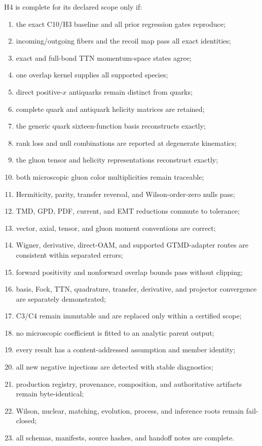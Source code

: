 \documentclass[11pt]{article}
\begin{document}
H4 is complete for its declared scope only if:
\begin{enumerate}
\item the exact C10/H3 baseline and all prior regression gates reproduce;
\item incoming/outgoing fibers and the recoil map pass all exact identities;
\item exact and full-bond TTN momentum-space states agree;
\item one overlap kernel supplies all supported species;
\item direct positive-\(x\) antiquarks remain distinct from quarks;
\item complete quark and antiquark helicity matrices are retained;
\item the generic quark sixteen-function basis reconstructs exactly;
\item rank loss and null combinations are reported at degenerate kinematics;
\item the gluon tensor and helicity representations reconstruct exactly;
\item both microscopic gluon color multiplicities remain traceable;
\item Hermiticity, parity, transfer reversal, and Wilson-order-zero nulls pass;
\item TMD, GPD, PDF, current, and EMT reductions commute to tolerance;
\item vector, axial, tensor, and gluon moment conventions are correct;
\item Wigner, derivative, direct-OAM, and supported GTMD-adapter routes are
consistent within separated errors;
\item forward positivity and nonforward overlap bounds pass without clipping;
\item basis, Fock, TTN, quadrature, transfer, derivative, and projector
convergence are separately demonstrated;
\item C3/C4 remain immutable and are replaced only within a certified scope;
\item no microscopic coefficient is fitted to an analytic parent output;
\item every result has a content-addressed assumption and member identity;
\item all new negative injections are detected with stable diagnostics;
\item production registry, provenance, composition, and authoritative
artifacts remain byte-identical;
\item Wilson, nuclear, matching, evolution, process, and inference roots remain
fail-closed;
\item all schemas, manifests, source hashes, and handoff notes are complete.
\end{enumerate}
\end{document}
